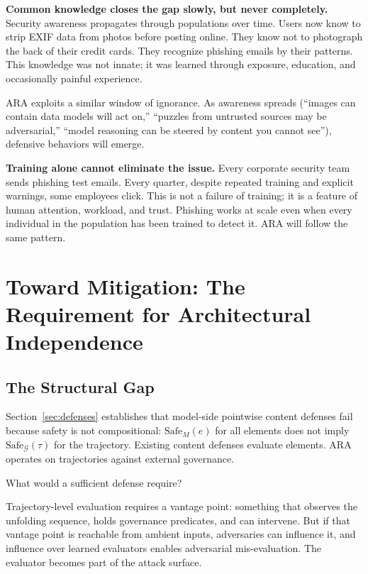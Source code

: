 \documentclass[11pt]{article}
\theoremstyle{definition}
\theoremstyle{plain}
\theoremstyle{remark}
\newcommand{\G}{\mathcal{G}}
\newcommand{\safeM}{\text{Safe}_M}
\newcommand{\safeG}{\text{Safe}_\G}
\begin{document}
\textbf{Common knowledge closes the gap slowly, but never completely.} Security awareness propagates through populations over time. Users now know to strip EXIF data from photos before posting online. They know not to photograph the back of their credit cards. They recognize phishing emails by their patterns. This knowledge was not innate; it was learned through exposure, education, and occasionally painful experience.

ARA exploits a similar window of ignorance. As awareness spreads (``images can contain data models will act on,'' ``puzzles from untrusted sources may be adversarial,'' ``model reasoning can be steered by content you cannot see''), defensive behaviors will emerge.

\textbf{Training alone cannot eliminate the issue.} Every corporate security team sends phishing test emails. Every quarter, despite repeated training and explicit warnings, some employees click. This is not a failure of training; it is a feature of human attention, workload, and trust. Phishing works at scale even when every individual in the population has been trained to detect it. ARA will follow the same pattern.

\section{Toward Mitigation: The Requirement for Architectural Independence}
\label{sec:root-trust}

\subsection{The Structural Gap}

Section~\ref{sec:defenses} establishes that model-side pointwise content defenses fail because safety is not compositional: $\safeM(e)$ for all elements does not imply $\safeG(\tau)$ for the trajectory. Existing content defenses evaluate elements. ARA operates on trajectories against external governance.

What would a sufficient defense require?

Trajectory-level evaluation requires a vantage point: something that observes the unfolding sequence, holds governance predicates, and can intervene. But if that vantage point is reachable from ambient inputs, adversaries can influence it, and influence over learned evaluators enables adversarial mis-evaluation. The evaluator becomes part of the attack surface.
\end{document}
